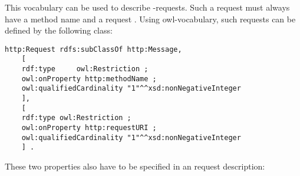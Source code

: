 %  

This vocabulary can be used to describe \http-requests.  Such a request must always have a method name and a request \uri.
Using owl-vocabulary, such requests can be defined by the following class:
\begin{verbatim}
http:Request rdfs:subClassOf http:Message, 
    [
    rdf:type     owl:Restriction ;
    owl:onProperty http:methodName ;
    owl:qualifiedCardinality "1"^^xsd:nonNegativeInteger
    ],
    [ 
    rdf:type owl:Restriction ;
    owl:onProperty http:requestURI ;
    owl:qualifiedCardinality "1"^^xsd:nonNegativeInteger
    ] .
\end{verbatim}
These two properties also have to be specified in an \http request description:

